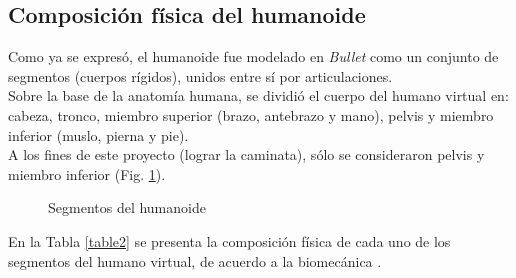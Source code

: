 \documentclass{article}
\begin{document}
\subsection{Composici\'on f\'isica del humanoide}
Como ya se expres\'o, el humanoide fue modelado en \textit{Bullet} como un conjunto de segmentos (cuerpos r\'igidos), unidos entre s\'i por articulaciones. \\
Sobre la base de la anatom\'ia humana, se dividi\'o el cuerpo del humano virtual en: cabeza, tronco, miembro superior (brazo, antebrazo y mano), pelvis y miembro inferior (muslo, pierna y pie). \\
A los fines de este proyecto (lograr la caminata), s\'olo se consideraron pelvis y miembro inferior (Fig. \ref{fig:humanoid_segments}).
\begin{figure}[H]%
  \centering
    \caption{Segmentos del humanoide}
    \label{fig:humanoid_segments}
\end{figure} 
\noindent En la Tabla \ref{table2} se presenta la composici\'on f\'isica de cada uno de los segmentos del humano virtual, de acuerdo a la biomec\'anica \cite{biomechanics}.
\begin {table}[H]
	\begin{center}
		\caption{Composici\'on f\'isica de cada segmento del humanoide}
		\label{table2}
	\end{center}
\end{table}
\end{document}
